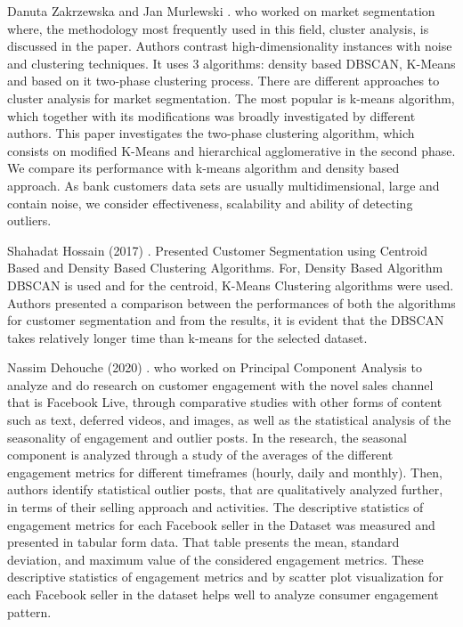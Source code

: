 \documentclass[conference]{IEEEtran}
\begin{document}
Danuta Zakrzewska and Jan Murlewski \cite{b14}. who worked on market segmentation where, the methodology most frequently used in this field, cluster analysis, is discussed in the paper. Authors contrast high-dimensionality instances with noise and clustering techniques. It uses 3 algorithms: density based DBSCAN, K-Means and based on it two-phase  clustering process. There are different approaches to cluster analysis for market segmentation. The most popular is k-means algorithm, which together with its modifications was  broadly investigated by different authors. This paper investigates the two-phase clustering algorithm, which consists on modified K-Means and hierarchical agglomerative in the second phase. We compare its performance with k-means algorithm and density based approach. As bank customers data sets are usually multidimensional, large and contain  noise, we consider effectiveness, scalability and ability of detecting outliers.

Shahadat Hossain (2017) \cite{b8}. Presented Customer Segmentation using Centroid Based and Density Based Clustering Algorithms. For, Density Based Algorithm DBSCAN is used and for the centroid, K-Means Clustering algorithms were used. Authors presented a comparison between the performances of both the algorithms for customer segmentation and from the results, it is evident that the DBSCAN takes relatively longer time than k-means for the selected dataset.

Nassim Dehouche (2020) \cite{b9}. who worked on Principal Component Analysis to analyze and do research on customer engagement with the novel sales channel that is Facebook Live, through comparative studies with other forms of content such as text, deferred videos, and images, as well as the statistical analysis of the seasonality of engagement and outlier posts. In the research, the seasonal component is analyzed through a study of the averages of the different engagement metrics for different timeframes (hourly, daily and monthly). Then, authors identify statistical outlier posts, that are qualitatively analyzed further, in terms of their selling approach and activities. The descriptive statistics of engagement metrics for each Facebook seller in the Dataset was measured and presented in tabular form data. That table presents the mean, standard deviation, and maximum value of the considered engagement metrics. These descriptive statistics of engagement metrics and by scatter plot visualization for each Facebook seller in the dataset helps well to analyze consumer engagement pattern.
\end{document}
